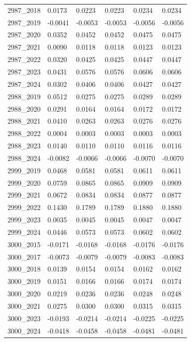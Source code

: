 \begin{table}[htbp]
\begin{tabular}{llllll}
2987_2018 & 0.0173 & 0.0223 & 0.0223 & 0.0234 & 0.0234 \\
2987_2019 & -0.0041 & -0.0053 & -0.0053 & -0.0056 & -0.0056 \\
2987_2020 & 0.0352 & 0.0452 & 0.0452 & 0.0475 & 0.0475 \\
2987_2021 & 0.0090 & 0.0118 & 0.0118 & 0.0123 & 0.0123 \\
2987_2022 & 0.0320 & 0.0425 & 0.0425 & 0.0447 & 0.0447 \\
2987_2023 & 0.0431 & 0.0576 & 0.0576 & 0.0606 & 0.0606 \\
2987_2024 & 0.0302 & 0.0406 & 0.0406 & 0.0427 & 0.0427 \\
2988_2019 & 0.0512 & 0.0275 & 0.0275 & 0.0289 & 0.0289 \\
2988_2020 & 0.0291 & 0.0164 & 0.0164 & 0.0172 & 0.0172 \\
2988_2021 & 0.0410 & 0.0263 & 0.0263 & 0.0276 & 0.0276 \\
2988_2022 & 0.0004 & 0.0003 & 0.0003 & 0.0003 & 0.0003 \\
2988_2023 & 0.0140 & 0.0110 & 0.0110 & 0.0116 & 0.0116 \\
2988_2024 & -0.0082 & -0.0066 & -0.0066 & -0.0070 & -0.0070 \\
2999_2019 & 0.0468 & 0.0581 & 0.0581 & 0.0611 & 0.0611 \\
2999_2020 & 0.0759 & 0.0865 & 0.0865 & 0.0909 & 0.0909 \\
2999_2021 & 0.0672 & 0.0834 & 0.0834 & 0.0877 & 0.0877 \\
2999_2022 & 0.1430 & 0.1789 & 0.1789 & 0.1880 & 0.1880 \\
2999_2023 & 0.0035 & 0.0045 & 0.0045 & 0.0047 & 0.0047 \\
2999_2024 & 0.0446 & 0.0573 & 0.0573 & 0.0602 & 0.0602 \\
3000_2015 & -0.0171 & -0.0168 & -0.0168 & -0.0176 & -0.0176 \\
3000_2017 & -0.0073 & -0.0079 & -0.0079 & -0.0083 & -0.0083 \\
3000_2018 & 0.0139 & 0.0154 & 0.0154 & 0.0162 & 0.0162 \\
3000_2019 & 0.0151 & 0.0166 & 0.0166 & 0.0174 & 0.0174 \\
3000_2020 & 0.0219 & 0.0236 & 0.0236 & 0.0248 & 0.0248 \\
3000_2021 & 0.0275 & 0.0300 & 0.0300 & 0.0315 & 0.0315 \\
3000_2023 & -0.0193 & -0.0214 & -0.0214 & -0.0225 & -0.0225 \\
3000_2024 & -0.0418 & -0.0458 & -0.0458 & -0.0481 & -0.0481 \\

\end{tabular}
\end{table}
